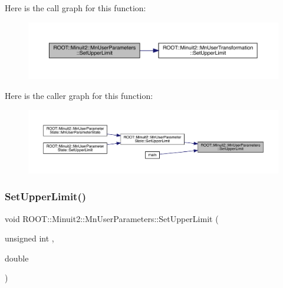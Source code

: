 Here is the call graph for this function\+:
\nopagebreak
\begin{figure}[H]
\begin{center}
\leavevmode
\includegraphics[width=350pt]{d6/d10/classROOT_1_1Minuit2_1_1MnUserParameters_a9127811ac07731aea64f1869a620d11b_cgraph}
\end{center}
\end{figure}
Here is the caller graph for this function\+:
\nopagebreak
\begin{figure}[H]
\begin{center}
\leavevmode
\includegraphics[width=350pt]{d6/d10/classROOT_1_1Minuit2_1_1MnUserParameters_a9127811ac07731aea64f1869a620d11b_icgraph}
\end{center}
\end{figure}
\mbox{\label{classROOT_1_1Minuit2_1_1MnUserParameters_a9127811ac07731aea64f1869a620d11b}} 
\subsubsection{\texorpdfstring{SetUpperLimit()}{SetUpperLimit()}\hspace{0.1cm}{\footnotesize\ttfamily [2/6]}}
{\footnotesize\ttfamily void R\+O\+O\+T\+::\+Minuit2\+::\+Mn\+User\+Parameters\+::\+Set\+Upper\+Limit (\begin{DoxyParamCaption}\item[{unsigned int}]{,  }\item[{double}]{ }\end{DoxyParamCaption})}

\mbox{\label{classROOT_1_1Minuit2_1_1MnUserParameters_a9127811ac07731aea64f1869a620d11b}} 
